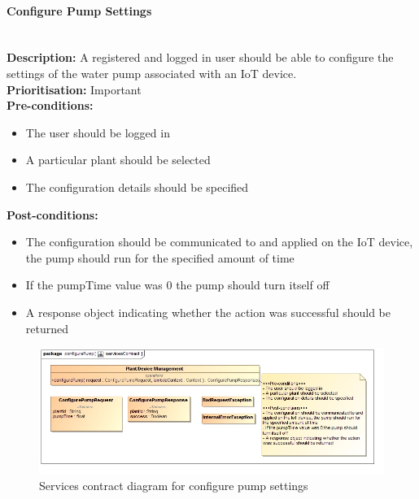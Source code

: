 \documentclass{article}
\begin{document}
\paragraph{Configure Pump Settings}\mbox{}\\
\textbf{Description:} A registered and logged in user should be able to configure the settings of the water pump associated with an IoT device.\\
\textbf{Prioritisation:} Important\\		
\textbf{Pre-conditions:}
\begin{itemize}
	\item The user should be logged in
	\item A particular plant should be selected
	\item The configuration details should be specified
\end{itemize}
\textbf{Post-conditions:}
\begin{itemize}
	\item The configuration should be communicated to and applied on the IoT device, the pump should run for the specified amount of time
	\item If the pumpTime value was 0 the pump should turn itself off
	\item A response object indicating whether the action was successful should be returned
\end{itemize}

\begin{figure}[H]
	\includegraphics[width=\linewidth]{images/ServicesContracts/configurePump.jpg}
	\caption{Services contract diagram for configure pump settings}
\end{figure}
\end{document}
